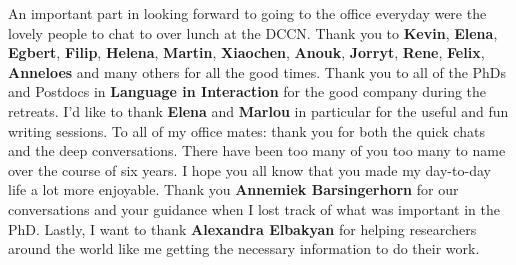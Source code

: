 An important part in looking forward to going to the office everyday were the lovely people to chat to over lunch at the DCCN. Thank you to \textbf{Kevin}, \textbf{Elena}, \textbf{Egbert}, \textbf{Filip}, \textbf{Helena}, \textbf{Martin}, \textbf{Xiaochen}, \textbf{Anouk}, \textbf{Jorryt}, \textbf{Rene}, \textbf{Felix}, \textbf{Anneloes} and many others for all the good times. \newline
Thank you to all of the PhDs and Postdocs in \textbf{Language in Interaction} for the good company during the retreats. I'd like to thank \textbf{Elena} and \textbf{Marlou} in particular for the useful and fun writing sessions. \newline
To all of my office mates: thank you for both the quick chats and the deep conversations. There have been too many of you too many to name over the course of six years. I hope you all know that you made my day-to-day life a lot more enjoyable. \newline
Thank you \textbf{Annemiek Barsingerhorn} for our conversations and your guidance when I lost track of what was important in the PhD. \newline
Lastly, I want to thank \textbf{Alexandra Elbakyan} for helping researchers around the world like me getting the necessary information to do their work. 

